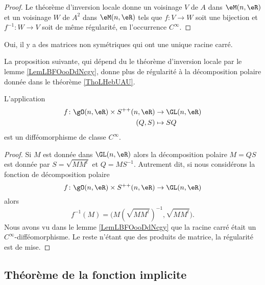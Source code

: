 \begin{proof}
    Le théorème d'inversion locale donne un voisinage \( V\) de $A$ dans \( \eM(n,\eR)\) et un voisinage \( W\) de \( A^2\) dans \( \eM(n,\eR)\) tels que \( f\colon V\to W\) soit une bijection  et \( f^{-1}\colon W\to V\) soit de même régularité, en l'occurrence \( C^{\infty}\).
\end{proof}

\begin{remark}
    Oui, il y a des matrices non symétriques qui ont une unique racine carré.
\end{remark}

La proposition suivante, qui dépend du le théorème d'inversion locale par le lemme \ref{LemLBFOooDdNcgy}, donne plus de régularité à la décomposition polaire donnée dans le théorème \ref{ThoLHebUAU}.
\begin{proposition}       \label{PropWCXAooDuFMjn}
    L'application
    \begin{equation}
        \begin{aligned}
            f\colon \gO(n,\eR)\times S^{++}(n,\eR)&\to \GL(n,\eR) \\
            (Q,S)&\mapsto SQ 
        \end{aligned}
    \end{equation}
    est un difféomorphisme de classe \( C^{\infty}\).
\end{proposition}

\begin{proof}
    Si \( M\) est donnée dans \( \GL(n,\eR)\) alors la décomposition polaire \( M=QS\) est donnée par \( S=\sqrt{MM^t}\) et \( Q=MS^{-1}\). Autrement dit, si nous considérons la fonction de décomposition polaire
    \begin{equation}
        f\colon \gO(n,\eR)\times S^{++}(n,\eR)\to \GL(n,\eR)
    \end{equation}
    alors
    \begin{equation}
        f^{-1}(M)=\big(  M(\sqrt{MM^t})^{-1},\sqrt{MM^t}  \big).
    \end{equation}
    Nous avons vu dans le lemme \ref{LemLBFOooDdNcgy} que la racine carré était un \( C^{\infty}\)-difféomorphisme. Le reste n'étant que des produits de matrice, la régularité est de mise.
\end{proof}

\subsection{Théorème de la fonction implicite}

